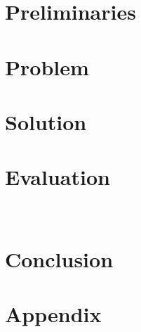 \section{Preliminaries}

%
\section{Problem}

%
\section{Solution}

%
\section{Evaluation}~\label{sec:eval}

%
\section{Conclusion}










\section{Appendix}




